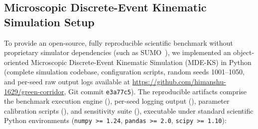 \documentclass[journal,10pt,twocolumn]{IEEEtran}
\begin{document}
\subsection{Microscopic Discrete-Event Kinematic Simulation Setup}
To provide an open-source, fully reproducible scientific benchmark without proprietary simulator dependencies (such as SUMO~\cite{krajzewicz2012}), we implemented an object-oriented Microscopic Discrete-Event Kinematic Simulation (MDE-KS) in Python (complete simulation codebase, configuration scripts, random seeds 1001--1050, and per-seed raw output logs available at \url{https://github.com/himanshu-1629/green-corridor}, Git commit \texttt{e3a77c5}). The reproducible artifacts comprise the benchmark execution engine (), per-seed logging output (), parameter calibration scripts (), and sensitivity suite (), executable under standard scientific Python environments (\texttt{numpy\,>=\,1.24}, \texttt{pandas\,>=\,2.0}, \texttt{scipy\,>=\,1.10}):
\end{document}
